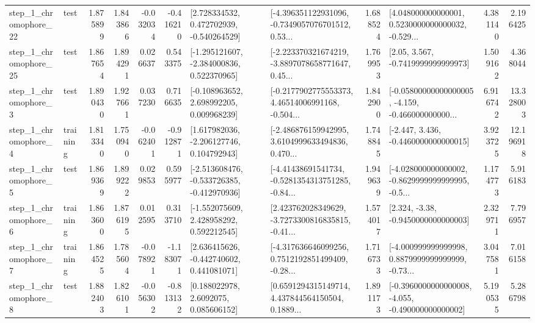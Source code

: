 \begin{tabular}{llrrrrllrlrr}
    step\_1\_chromophore\_22 &      test &      1.875899 &    1.843866 &     -0.032034 & -0.416210 &    [2.728334532, 0.472702939, -0.540264529] &  [-4.396351122931096, -0.7349057076701512, 0.53... &       1.688524 &  [4.048000000000001, 0.5230000000000032, -0.529... &            4.381140 &          2.196425 \\
    step\_1\_chromophore\_25 &      test &      1.867654 &    1.894291 &      0.026637 &  0.543375 &   [-1.295121607, -2.384000836, 0.522370965] &  [-2.223370321674219, -3.8897078658771647, 0.45... &       1.769953 &                 [2.05, 3.567, -0.7419999999999973] &            1.509162 &          4.368044 \\
     step\_1\_chromophore\_3 &      test &      1.890430 &    1.927661 &      0.037230 &  0.716635 &    [-0.108963652, 2.698992205, 0.009968239] &  [-0.2177902775553373, 4.46514006991168, -0.504... &       1.842900 &  [-0.05800000000000005, -4.159, -0.466000000000... &            6.916742 &         13.328003 \\
     step\_1\_chromophore\_4 &  training &      1.813340 &    1.750940 &     -0.062401 & -0.912871 &    [1.617982036, -2.206127746, 0.104792943] &  [-2.486876159942995, 3.6104999633494836, 0.470... &       1.748845 &               [-2.447, 3.436, -0.4460000000000015] &            3.923725 &         12.196918 \\
     step\_1\_chromophore\_5 &      test &      1.869369 &    1.899222 &      0.029853 &  0.595977 &  [-2.513608476, -0.533726385, -0.412970936] &  [-4.41438691541734, -0.5281354313751285, -0.84... &       1.949639 &  [-4.028000000000002, -0.8629999999999995, -0.5... &            1.174773 &          5.916183 \\
     step\_1\_chromophore\_6 &  training &      1.863600 &    1.876195 &      0.012595 &  0.313710 &    [-1.552075609, 2.428958292, 0.592212545] &  [2.423762028349629, -3.7273300816835815, -0.41... &       1.574017 &                [2.324, -3.38, -0.9450000000000003] &            2.329711 &          7.796957 \\
     step\_1\_chromophore\_7 &  training &      1.864525 &    1.785604 &     -0.078921 & -1.183071 &    [2.636415626, -0.442740602, 0.441081071] &  [-4.317636646099256, 0.7512192851499409, -0.28... &       1.716733 &  [-4.000999999999998, 0.8879999999999999, -0.73... &            3.047581 &          7.016158 \\
     step\_1\_chromophore\_8 &      test &      1.882403 &    1.826101 &     -0.056302 & -0.813132 &       [0.188022978, 2.6092075, 0.085606152] &  [0.6591294315149714, 4.437844564150504, 0.1889... &       1.891173 &  [-0.3960000000000008, -4.055, -0.490000000000002] &            5.190535 &          5.286798 \\

\end{tabular}
